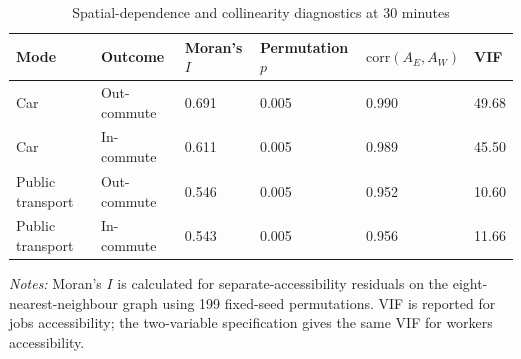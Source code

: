 \begin{table}[htbp]
\centering
\scriptsize
\caption{Spatial-dependence and collinearity diagnostics at 30 minutes}
\label{tab:diagnostics}
\begin{tabular}{llllll}
\toprule
Mode & Outcome & Moran's $I$ & Permutation $p$ & $\mathrm{corr}(A_E,A_W)$ & VIF \\
\midrule
Car & Out-commute & 0.691 & 0.005 & 0.990 & 49.68 \\
Car & In-commute & 0.611 & 0.005 & 0.989 & 45.50 \\
Public transport & Out-commute & 0.546 & 0.005 & 0.952 & 10.60 \\
Public transport & In-commute & 0.543 & 0.005 & 0.956 & 11.66 \\
\bottomrule
\end{tabular}
\par\vspace{2pt}
\begin{minipage}{0.96\linewidth}\footnotesize\textit{Notes:} Moran's $I$ is calculated for separate-accessibility residuals on the eight-nearest-neighbour graph using 199 fixed-seed permutations. VIF is reported for jobs accessibility; the two-variable specification gives the same VIF for workers accessibility.
\end{minipage}
\end{table}
